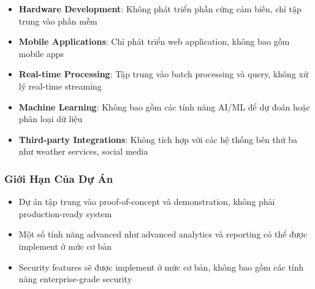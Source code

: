 \begin{itemize}
    \item \textbf{Hardware Development}: Không phát triển phần cứng cảm biến, chỉ tập trung vào phần mềm
    \item \textbf{Mobile Applications}: Chỉ phát triển web application, không bao gồm mobile apps
    \item \textbf{Real-time Processing}: Tập trung vào batch processing và query, không xử lý real-time streaming
    \item \textbf{Machine Learning}: Không bao gồm các tính năng AI/ML để dự đoán hoặc phân loại dữ liệu
    \item \textbf{Third-party Integrations}: Không tích hợp với các hệ thống bên thứ ba như weather services, social media
\end{itemize}

\subsubsection{Giới Hạn Của Dự Án}

\begin{itemize}
    \item Dự án tập trung vào proof-of-concept và demonstration, không phải production-ready system
    \item Một số tính năng advanced như advanced analytics và reporting có thể được implement ở mức cơ bản
    \item Security features sẽ được implement ở mức cơ bản, không bao gồm các tính năng enterprise-grade security
\end{itemize}

